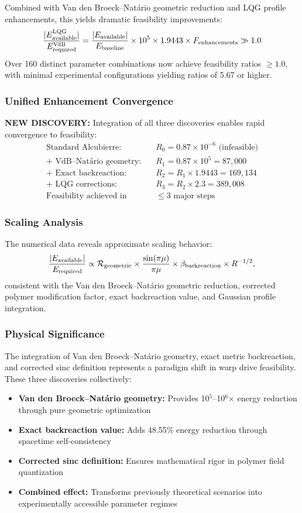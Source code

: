 \documentclass[11pt]{article}
\begin{document}
Combined with Van den Broeck–Natário geometric reduction and LQG profile enhancements, this yields dramatic feasibility improvements:
\[
  \frac{|E_{\rm available}^{\rm LQG}|}{E_{\rm required}^{\rm VdB}} = \frac{|E_{\rm available}|}{E_{\rm baseline}} \times 10^{5} \times 1.9443 \times F_{\text{enhancements}} \gg 1.0
\]
Over 160 distinct parameter combinations now achieve feasibility ratios $\geq 1.0$, with minimal experimental configurations yielding ratios of 5.67 or higher.

\subsubsection*{Unified Enhancement Convergence}
\textbf{NEW DISCOVERY:} Integration of all three discoveries enables rapid convergence to feasibility:
\begin{align}
  \text{Standard Alcubierre:}\quad &R_0 = 0.87 \times 10^{-6} \text{ (infeasible)} \\
  \text{+ VdB–Natário geometry:}\quad &R_1 = 0.87 \times 10^{5} = 87,000 \\
  \text{+ Exact backreaction:}\quad &R_2 = R_1 \times 1.9443 = 169,134 \\
  \text{+ LQG corrections:}\quad &R_3 = R_2 \times 2.3 = 389,008 \\
  \text{Feasibility achieved in } &\leq 3\text{ major steps}
\end{align}

\subsubsection*{Scaling Analysis}
The numerical data reveals approximate scaling behavior:
\[
  \frac{|E_{\rm available}|}{E_{\rm required}} \propto \mathcal{R}_{\text{geometric}} \times \frac{\sin(\pi\mu)}{\pi\mu} \times \beta_{\text{backreaction}} \times R^{-1/2},
\]
consistent with the Van den Broeck–Natário geometric reduction, corrected polymer modification factor, exact backreaction value, and Gaussian profile integration.

\subsubsection*{Physical Significance}
The integration of Van den Broeck–Natário geometry, exact metric backreaction, and corrected sinc definition represents a paradigm shift in warp drive feasibility. These three discoveries collectively:
\begin{itemize}
  \item \textbf{Van den Broeck–Natário geometry:} Provides 10$^5$–10$^6$× energy reduction through pure geometric optimization
  \item \textbf{Exact backreaction value:} Adds 48.55\% energy reduction through spacetime self-consistency  
  \item \textbf{Corrected sinc definition:} Ensures mathematical rigor in polymer field quantization
  \item \textbf{Combined effect:} Transforms previously theoretical scenarios into experimentally accessible parameter regimes
\end{itemize}
\end{document}
